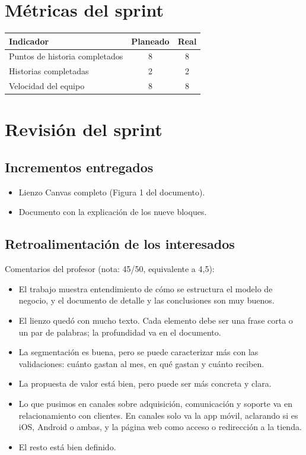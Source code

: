 \documentclass[11pt,a4paper]{article}
\begin{document}
\section{Métricas del sprint}

\begin{tabularx}{\textwidth}{X c c}
  \toprule
  \textbf{Indicador} & \textbf{Planeado} & \textbf{Real} \\
  \midrule
  Puntos de historia completados & 8 & 8 \\
  Historias completadas          & 2 & 2 \\
  Velocidad del equipo           & 8 & 8 \\
  \bottomrule
\end{tabularx}

\section{Revisión del sprint}

\subsection{Incrementos entregados}
\begin{itemize}[leftmargin=1.5em]
  \item {Lienzo Canvas completo (Figura 1 del documento).}
  \item {Documento con la explicación de los nueve bloques.}
\end{itemize}

\subsection{Retroalimentación de los interesados}
{Comentarios del profesor (nota: 45/50, equivalente a 4,5):}
\begin{itemize}[leftmargin=1.5em]
  \item {El trabajo muestra entendimiento de cómo se estructura el modelo de negocio, y el documento de detalle y las conclusiones son muy buenos.}
  \item {El lienzo quedó con mucho texto. Cada elemento debe ser una frase corta o un par de palabras; la profundidad va en el documento.}
  \item {La segmentación es buena, pero se puede caracterizar más con las validaciones: cuánto gastan al mes, en qué gastan y cuánto reciben.}
  \item {La propuesta de valor está bien, pero puede ser más concreta y clara.}
  \item {Lo que pusimos en canales sobre adquisición, comunicación y soporte va en relacionamiento con clientes. En canales solo va la app móvil, aclarando si es iOS, Android o ambas, y la página web como acceso o redirección a la tienda.}
  \item {El resto está bien definido.}
\end{itemize}
\end{document}
